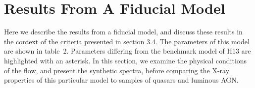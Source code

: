 \documentclass[useAMS,usenatbib]{mn2e_x}
\begin{document}




\section{Results From A Fiducial Model}
Here we describe the results from a fiducial model,
and discuss these results in the context of the criteria 
presented in section 3.4. The parameters of this model are shown in table~2.
Parameters differing from the benchmark model of H13 are 
highlighted with an asterisk. In this section, we examine the physical 
conditions of the flow, and present the synthetic spectra, before comparing
the X-ray properties of this particular model to samples of
quasars and luminous AGN. 
\end{document}
